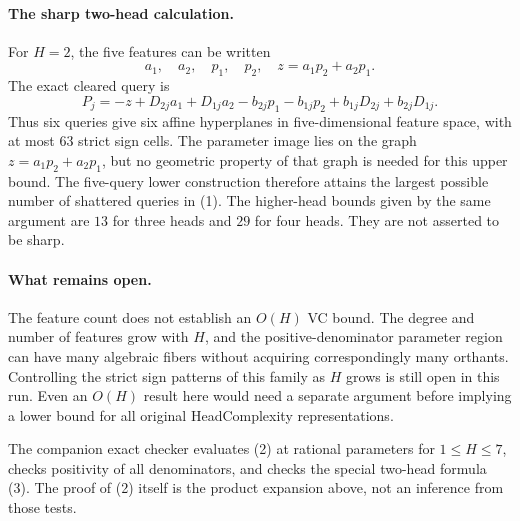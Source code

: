 \documentclass[11pt]{article}
\begin{document}
\paragraph{The sharp two-head calculation.}
For $H=2$, the five features can be written
\[
 a_1,\quad a_2,\quad p_1,\quad p_2,\quad
 z=a_1p_2+a_2p_1.
\]
The exact cleared query is
\[
 P_j=-z+D_{2j}a_1+D_{1j}a_2-b_{2j}p_1-b_{1j}p_2
       +b_{1j}D_{2j}+b_{2j}D_{1j}.
 \tag{3}
\]
Thus six queries give six affine hyperplanes in five-dimensional feature
space, with at most $63$ strict sign cells. The parameter image lies on
the graph $z=a_1p_2+a_2p_1$, but no geometric property of that graph is
needed for this upper bound. The five-query lower construction therefore
attains the largest possible number of shattered queries in (1).
The higher-head bounds given by the same argument are $13$ for three
heads and $29$ for four heads. They are not asserted to be sharp.

\paragraph{What remains open.}
The feature count does not establish an $O(H)$ VC bound. The degree and
number of features grow with $H$, and the positive-denominator parameter
region can have many algebraic fibers without acquiring correspondingly
many orthants. Controlling the strict sign patterns of this family as
$H$ grows is still open in this run. Even an $O(H)$ result here would
need a separate argument before implying a lower bound for all original
HeadComplexity representations.

The companion exact checker evaluates (2) at rational parameters for
$1\leq H\leq7$, checks positivity of all denominators, and checks the
special two-head formula (3). The proof of (2) itself is the product
expansion above, not an inference from those tests.
\end{document}
